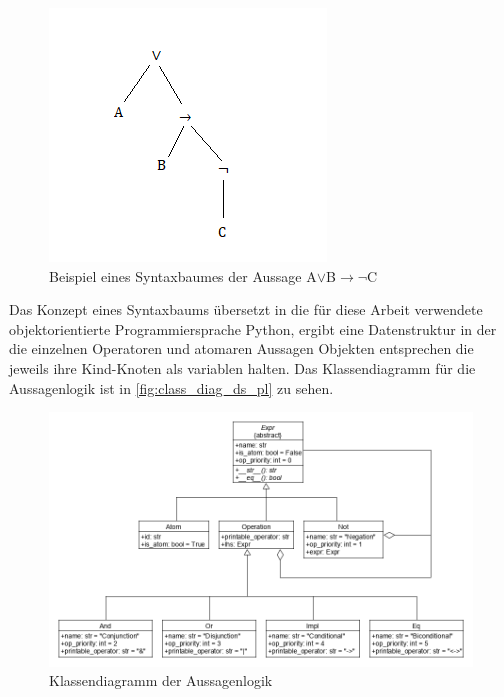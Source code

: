 \begin{figure}[H]
\begin{center}
\includegraphics[scale=1]{images/example_syntax_tree.png}
\caption{Beispiel eines Syntaxbaumes der Aussage A$\vee$B$\rightarrow\neg$C}
\label{fig:example_syntax_tree}
\end{center}
\end{figure}

Das Konzept eines Syntaxbaums übersetzt in die für diese Arbeit verwendete objektorientierte Programmiersprache Python, ergibt eine Datenstruktur in der die einzelnen Operatoren und atomaren Aussagen Objekten entsprechen die jeweils ihre Kind-Knoten als variablen halten. Das Klassendiagramm für die Aussagenlogik ist in \autoref{fig:class_diag_ds_pl} zu sehen.

\begin{figure}[H]
\begin{center}
\includegraphics[scale=0.5]{images/class_diag_ds_pl.png}
\caption{Klassendiagramm der Aussagenlogik}
\label{fig:class_diag_ds_pl}
\end{center}
\end{figure}

